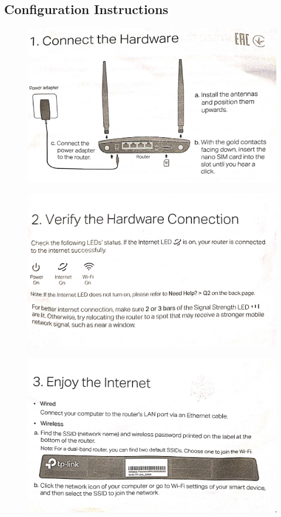 \documentclass[11pt]{article}
\begin{document}
\subsection{Configuration Instructions}

\begin{figure}[H]
    \centering
    \includegraphics[width=.85\textwidth]{lab router/1.png}
\end{figure}

\begin{figure}[H]
    \centering
    \includegraphics[width=.85\textwidth]{lab router/2.png}
\end{figure}

\begin{figure}[H]
    \centering
    \includegraphics[width=.85\textwidth]{lab router/3.png}
\end{figure}
\end{document}
